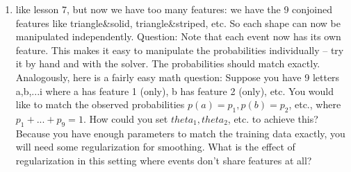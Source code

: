 \documentclass[11pt,letterpaper]{article}
\begin{document}
{\begin{enumerate}
What happens to the optimal log-likelihood and why?
What happens to the weights and why?
The observed counts increased by a factor of 100. Which of the expected counts increased by a factor of much less than 100?
The model has decreased its estimated probability for those outcomes. Which other outcomes did it move their probability to?
What happens if you also increase C by a factor of 100?
Discussion: tradeoff between N and C. Remember that the optimal θ maximizes F = (log-likelihood - regularizer), a difference of two functions.
Increasing N stretches the first function vertically; the more training data there is, the more the solver just tries to fit the training data.
Increasing C stretches the second function vertically; the stronger the regularizer is, the harder the solver will try to keep the weights close to 0.
Doubling both N and C will just stretch F vertically, leaving the optimal θ unchanged.

\item %
like lesson 7, but now we have too many features: we have the 9 conjoined features like triangle\&solid, triangle\&striped, etc.  So each shape can now be manipulated independently.
Question:  Note that each event now has its own feature.  This makes it easy to manipulate the probabilities individually -- try it by hand and with the solver.  The probabilities should match exactly.  Analogously, here is a fairly easy math question: Suppose you have 9 letters a,b,...i where a has feature 1 (only), b has feature 2 (only), etc.  You would like to match the observed probabilities $p(a)=p_1, p(b)=p_2$, etc., where $p_1+...+p_9=1$.  How could you set $theta_1, theta_2$, etc. to achieve this?   Because you have enough parameters to match the training data exactly, you will need some regularization for smoothing.  What is the effect of regularization in this setting where events don’t share features at all? 
\end{enumerate}

}
\end{document}

